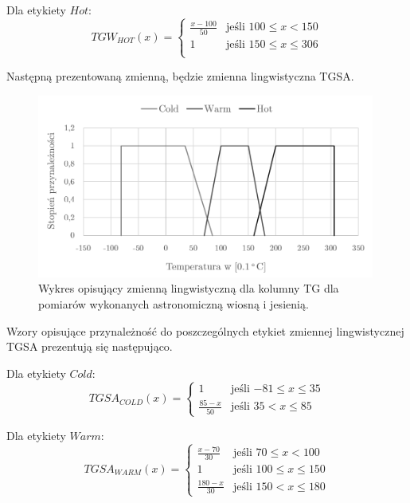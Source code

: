 \documentclass{classrep}
\begin{document}
Dla etykiety $Hot$:
\begin{equation}
{TGW}_{HOT}(x)= \left\{ \begin{array}{ll}
\frac{x-100}{50} & \textrm{jeśli $100 \leq x < 150$} \\
1 			 & \textrm{jeśli $150 \leq x \leq 306$} \\
\end{array} \right.
\end{equation}


Następną prezentowaną zmienną, będzie zmienna lingwistyczna TGSA.
\begin{figure}[H]
	\centering
	\includegraphics[width=0.99\textwidth]{Pictures/TermsCharts/TG_WJ.png}
	\caption{Wykres opisujący zmienną lingwistyczną dla kolumny TG dla pomiarów wykonanych astronomiczną wiosną i jesienią.}
\end{figure}

Wzory opisujące przynależność do poszczególnych etykiet zmiennej lingwistycznej TGSA prezentują się następująco. \newline

Dla etykiety $Cold$:
\begin{equation}
{TGSA}_{COLD}(x)= \left\{ \begin{array}{ll}
1 			& \textrm{jeśli $-81 \leq x \leq 35$} \\
\frac{85-x}{50} 	& \textrm{jeśli $35 < x \leq 85$}
\end{array} \right.
\end{equation}

Dla etykiety $Warm$:
\begin{equation}
{TGSA}_{WARM}(x)= \left\{ \begin{array}{ll}
\frac{x-70}{30} 	 & \textrm{jeśli $70 \leq x < 100$} \\
1 			 & \textrm{jeśli $100 \leq x \leq 150$} \\
\frac{180-x}{30} & \textrm{jeśli $150 < x \leq 180$}
\end{array} \right.
\end{equation}
\end{document}
